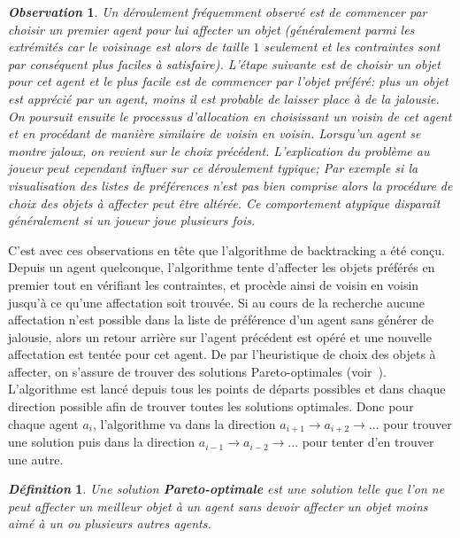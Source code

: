 \documentclass[a4paper, 11pt]{article}
\newtheorem{observation}{\it\bfseries Observation}
\newtheorem{definition}{\it\bfseries Définition}
\begin{document}
	\begin{observation}
	\label{obs-backtrack}
	Un déroulement fréquemment observé est de commencer par choisir un premier agent pour lui affecter un objet (généralement parmi les extrémités car le voisinage est alors de taille $1$ seulement et les contraintes sont par conséquent plus faciles à satisfaire). L'étape suivante est de choisir un objet pour cet agent et le plus facile est de commencer par l'objet préféré: plus un objet est apprécié par un agent, moins il est probable de laisser place à de la jalousie. On poursuit ensuite le processus d'allocation en choisissant un voisin de cet agent et en procédant de manière similaire de voisin en voisin. Lorsqu'un agent se montre jaloux, on revient sur le choix précédent. L'explication du problème au joueur peut cependant influer sur ce déroulement typique; Par exemple si la visualisation des listes de préférences n'est pas bien comprise alors la procédure de choix des objets à affecter peut être altérée. Ce comportement atypique disparaît généralement si un joueur joue plusieurs fois.
	\end{observation}
	
	C'est avec ces observations en tête que l'algorithme de backtracking a été conçu. Depuis un agent quelconque, l'algorithme tente d'affecter les objets préférés en premier tout en vérifiant les contraintes, et procède ainsi de voisin en voisin jusqu'à ce qu'une affectation soit trouvée. Si au cours de la recherche aucune affectation n'est possible dans la liste de préférence d'un agent sans générer de jalousie, alors un retour arrière sur l'agent précédent est opéré et une nouvelle affectation est tentée pour cet agent. De par l'heuristique de choix des objets à affecter, on s'assure de trouver des solutions Pareto-optimales (voir~). L'algorithme est lancé depuis tous les points de départs possibles et dans chaque direction possible afin de trouver toutes les solutions optimales. Donc pour chaque agent $a_i$, l'algorithme va dans la direction $a_{i+1} \rightarrow a_{i+2} \rightarrow ...$ pour trouver une solution puis dans la direction $a_{i-1} \rightarrow a_{i-2} \rightarrow ...$ pour tenter d'en trouver une autre.
	
	\begin{definition}
	\label{pareto-def}
	    Une solution \textbf{Pareto-optimale} est une solution telle que l'on ne peut affecter un meilleur objet à un agent sans devoir affecter un objet moins aimé à un ou plusieurs autres agents. 
	\end{definition}
	
\end{document}
